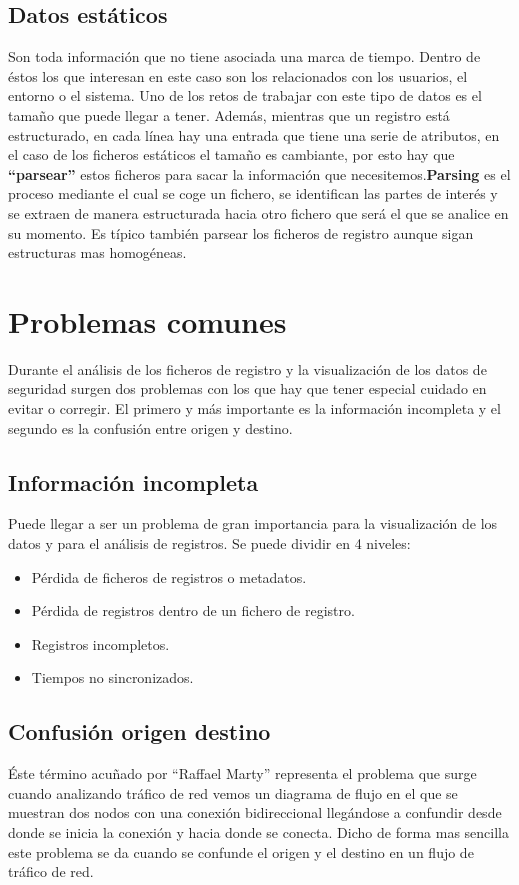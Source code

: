 \subsection{Datos estáticos}
Son toda información que no tiene asociada una marca de tiempo. Dentro de éstos los que interesan en este caso son los relacionados con los usuarios, el entorno o el sistema. Uno de los retos de trabajar con este tipo de datos es el tamaño que puede llegar a tener. Además, mientras que un registro está estructurado, en cada línea hay una entrada que tiene una serie de atributos, en el caso de los ficheros estáticos el tamaño es cambiante, por esto hay que \textbf{“parsear”} estos ficheros para sacar la información que necesitemos.\textbf{Parsing} es el proceso mediante el cual se coge un fichero, se identifican las partes de interés y se extraen de manera estructurada hacia otro fichero que será el que se analice en su momento. Es típico también parsear los ficheros de registro aunque sigan estructuras mas homogéneas.

\bigskip

\section{Problemas comunes} \cite{ASV}
Durante el análisis de los ficheros de registro y la visualización de los datos de seguridad surgen dos problemas con los que hay que tener especial cuidado en evitar o corregir. El primero y más importante es la información incompleta y el segundo es la confusión entre origen y destino.
\bigskip

\subsection{Información incompleta}
Puede llegar a ser un problema de gran importancia para la visualización de los datos y para el análisis de registros. Se puede dividir en 4 niveles:

\begin{itemize}
\item Pérdida de ficheros de registros o metadatos.
\item Pérdida de registros dentro de un fichero de registro.
\item Registros incompletos.
\item Tiempos no sincronizados.
\end{itemize}

\subsection{Confusión origen destino}
Éste término acuñado por “Raffael Marty” representa el problema que surge cuando analizando tráfico de red vemos un diagrama de flujo en el que se muestran dos nodos con una conexión bidireccional llegándose a confundir desde donde se inicia la conexión y hacia donde se conecta. Dicho de forma mas sencilla este problema se da cuando se confunde el origen y el destino en un flujo de tráfico de red.
\bigskip

